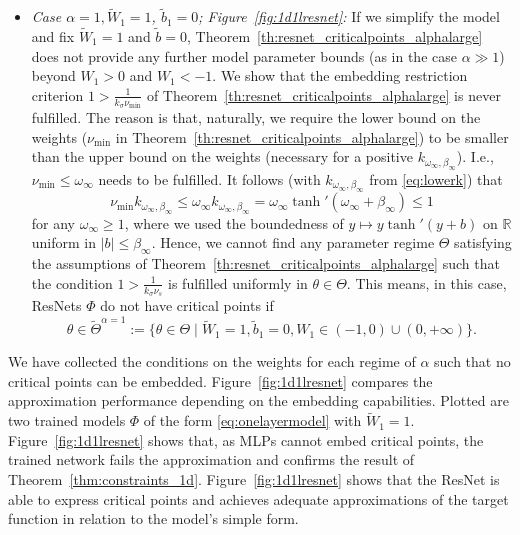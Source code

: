 \documentclass[10pt]{article}
\newtheorem{observation}[theorem]{Observation}
\theoremstyle{definition}
\numberwithin{equation}{section}
\newcommand{\R}{\mathbb{R}}
\newcommand{\Wt}{\widetilde{W}}
\newcommand{\bt}{\tilde{b}}
\begin{document}
\begin{itemize}
    
\item \emph{Case $\alpha = 1, \Wt_1 = 1$, $\bt_1 = 0$; Figure~\ref{fig:1d1lresnet}:} If we simplify the model and fix $\Wt_1 = 1$ and $\bt = 0$, Theorem~\ref{th:resnet_criticalpoints_alphalarge} does not provide any further model parameter bounds (as in the case $\alpha \gg 1$) beyond $W_1 > 0$ and $W_1 < -1$. We show that the embedding restriction criterion $1 > \frac{1}{ k_\sigma \nu_{\min}}$ of Theorem~\ref{th:resnet_criticalpoints_alphalarge} is never fulfilled. The reason is that, naturally, we require the lower bound on the weights ($\nu_{\min}$ in Theorem~\ref{th:resnet_criticalpoints_alphalarge}) to be smaller than the upper bound on the weights (necessary for a positive $k_{\omega_\infty, \beta_\infty}$). I.e., $\nu_{\min} \leq \omega_\infty$ needs to be fulfilled. It follows (with $k_{\omega_\infty, \beta_\infty}$ from \eqref{eq:lowerk}) that
    \begin{equation}
    \nu_{\min} k_{\omega_\infty, \beta_\infty}\leq  \omega_\infty k_{\omega_\infty, \beta_\infty}  = \omega_\infty \tanh'(\omega_\infty + \beta_\infty)  \leq 1
    \end{equation}
    for any $\omega_\infty \geq 1$, where we used the boundedness of $y\mapsto y \tanh'(y + b)$ on $\R$ uniform in $|b| \leq \beta_\infty$. Hence, we cannot find any parameter regime $\Theta$ satisfying the assumptions of Theorem~\ref{th:resnet_criticalpoints_alphalarge} such that the condition $1 > \frac{1}{ k_\sigma \nu_s}$ is fulfilled uniformly in $\theta\in \Theta$. This means, in this case, ResNets $\Phi$ do not have critical points if 
    \begin{equation}
     \theta \in \tilde{\Theta}^{\alpha = 1} := \{  \theta \in \Theta \mid \Wt_1 = 1, \bt_1 = 0 , W_1 \in ( -1, 0) \cup (0, +\infty)\}.
        \label{eq:thetaalphaone}
    \end{equation}
\end{itemize}
We have collected the conditions on the weights for each regime of $\alpha$ such that no critical points can be embedded. Figure~\ref{fig:1d1lresnet} compares the approximation performance depending on the embedding capabilities. Plotted are two trained models $\Phi$ of the form \eqref{eq:onelayermodel} with $\Wt_1 = 1$. Figure~\ref{fig:1d1lresnet} shows that, as MLPs cannot embed critical points, the trained network fails the approximation and confirms the result of Theorem~\ref{thm:constraints_1d}. Figure~\ref{fig:1d1lresnet} shows that the ResNet is able to express critical points and achieves adequate approximations of the target function in relation to the model's simple form.
\end{document}
